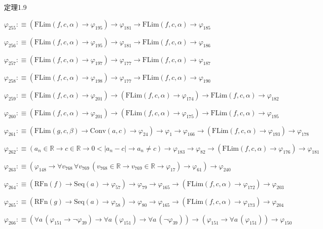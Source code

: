 \begin{fullproof}{定理1.9}
\begin{abbrevlist}
\item $\varphi_{255} :\equiv (\mathrm{FLim}(f,c,\alpha) \to \varphi_{195}) \to \varphi_{181} \to \mathrm{FLim}(f,c,\alpha) \to \varphi_{185}$
\item $\varphi_{256} :\equiv (\mathrm{FLim}(f,c,\alpha) \to \varphi_{195}) \to \varphi_{181} \to \mathrm{FLim}(f,c,\alpha) \to \varphi_{186}$
\item $\varphi_{257} :\equiv (\mathrm{FLim}(f,c,\alpha) \to \varphi_{197}) \to \varphi_{177} \to \mathrm{FLim}(f,c,\alpha) \to \varphi_{187}$
\item $\varphi_{258} :\equiv (\mathrm{FLim}(f,c,\alpha) \to \varphi_{198}) \to \varphi_{177} \to \mathrm{FLim}(f,c,\alpha) \to \varphi_{190}$
\item $\varphi_{259} :\equiv (\mathrm{FLim}(f,c,\alpha) \to \varphi_{201}) \to (\mathrm{FLim}(f,c,\alpha) \to \varphi_{174}) \to \mathrm{FLim}(f,c,\alpha) \to \varphi_{182}$
\item $\varphi_{260} :\equiv (\mathrm{FLim}(f,c,\alpha) \to \varphi_{201}) \to (\mathrm{FLim}(f,c,\alpha) \to \varphi_{175}) \to \mathrm{FLim}(f,c,\alpha) \to \varphi_{195}$
\item $\varphi_{261} :\equiv (\mathrm{FLim}(g,c,\beta) \to \mathrm{Conv}(a,c) \to \varphi_{24}) \to \varphi_{1} \to \varphi_{166} \to (\mathrm{FLim}(f,c,\alpha) \to \varphi_{193}) \to \varphi_{178}$
\item $\varphi_{262} :\equiv (a_{n} \in \mathbb{R} \to c \in \mathbb{R} \to 0 < \lvert a_{n} - c \rvert \to a_{n} \neq c) \to \varphi_{183} \to \varphi_{82} \to (\mathrm{FLim}(f,c,\alpha) \to \varphi_{176}) \to \varphi_{181}$
\item $\varphi_{263} :\equiv (\varphi_{148} \to \forall v_{768}\,\forall v_{769}\,(v_{768} \in \mathbb{R} \to v_{769} \in \mathbb{R} \to \varphi_{17}) \to \varphi_{61}) \to \varphi_{240}$
\item $\varphi_{264} :\equiv (\mathrm{RFn}(f) \to \mathrm{Seq}(a) \to \varphi_{57}) \to \varphi_{79} \to \varphi_{165} \to (\mathrm{FLim}(f,c,\alpha) \to \varphi_{172}) \to \varphi_{203}$
\item $\varphi_{265} :\equiv (\mathrm{RFn}(g) \to \mathrm{Seq}(a) \to \varphi_{58}) \to \varphi_{80} \to \varphi_{165} \to (\mathrm{FLim}(f,c,\alpha) \to \varphi_{173}) \to \varphi_{204}$
\item $\varphi_{266} :\equiv (\forall a\,(\varphi_{151} \to \neg \varphi_{39}) \to \forall a\,(\varphi_{151}) \to \forall a\,(\neg \varphi_{39})) \to (\varphi_{151} \to \forall a\,(\varphi_{151})) \to \varphi_{150}$

\end{abbrevlist}
\end{fullproof}
